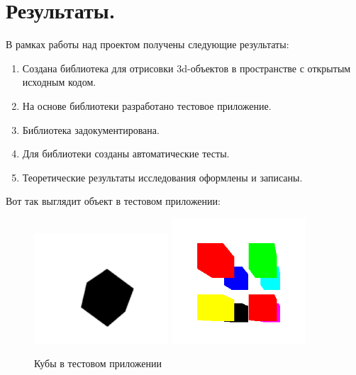\documentclass{article}
\begin{document}
\section{Результаты.}

В рамках работы над проектом получены следующие результаты:

\begin{enumerate}
	\item Создана библиотека для отрисовки 3d-объектов в пространстве с открытым исходным кодом.
	\item На основе библиотеки разработано тестовое приложение.
	\item Библиотека задокументирована.
	\item Для библиотеки созданы автоматические тесты.
	\item Теоретические результаты исследования оформлены и записаны.
\end{enumerate}

Вот так выглядит объект в тестовом приложении:

\begin{center}
\begin{figure}[H]
\includegraphics[width=5cm]{cube-1.png}
\includegraphics[width=5cm]{cube-2.png}
\caption{Кубы в тестовом приложении}
\label{ris:image}
\end{figure}
\end{center}
\end{document}
